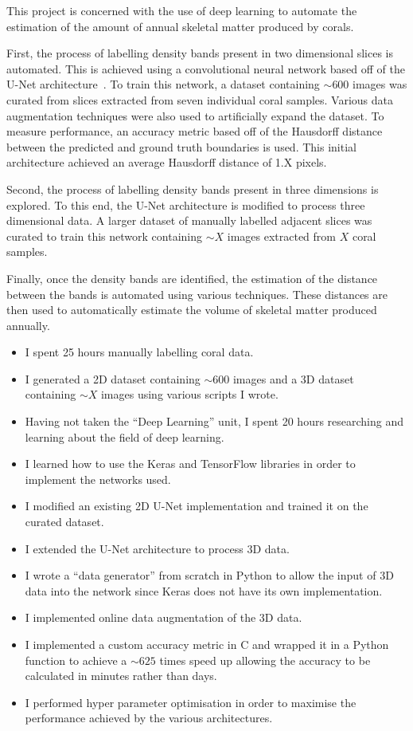 This project is concerned with the use of deep learning to automate the estimation of the amount of annual skeletal matter produced by corals.

First, the process of labelling density bands present in two dimensional slices is automated. This is achieved using a convolutional neural network based off of the U-Net architecture~\cite{ronneberger2015u}. To train this network, a dataset containing ${\sim}600$ images was curated from slices extracted from seven individual coral samples. Various data augmentation techniques were also used to artificially expand the dataset. To measure performance, an accuracy metric based off of the Hausdorff distance between the predicted and ground truth boundaries is used. This initial architecture achieved an average Hausdorff distance of 1.X pixels.

Second, the process of labelling density bands present in three dimensions is explored. To this end, the U-Net architecture is modified to process three dimensional data. A larger dataset of manually labelled adjacent slices was curated to train this network containing ${\sim}X$ images extracted from $X$ coral samples.

Finally, once the density bands are identified, the estimation of the distance between the bands is automated using various techniques. These distances are then used to automatically estimate the volume of skeletal matter produced annually.

\begin{itemize}
    \item I spent 25 hours manually labelling coral data.
    \item I generated a 2D dataset containing ${\sim}600$ images and a 3D dataset containing ${\sim}X$ images using various scripts I wrote.
    \item Having not taken the ``Deep Learning'' unit, I spent 20 hours researching and learning about the field of deep learning.
    \item I learned how to use the Keras and TensorFlow libraries in order to implement the networks used.
    \item I modified an existing 2D U-Net implementation and trained it on the curated dataset.
    \item I extended the U-Net architecture to process 3D data.
    \item I wrote a ``data generator'' from scratch in Python to allow the input of 3D data into the network since Keras does not have its own implementation.
    \item I implemented online data augmentation of the 3D data.
    \item I implemented a custom accuracy metric in C and wrapped it in a Python function to achieve a ${\sim}625$ times speed up allowing the accuracy to be calculated in minutes rather than days.
    \item I performed hyper parameter optimisation in order to maximise the performance achieved by the various architectures.
\end{itemize}